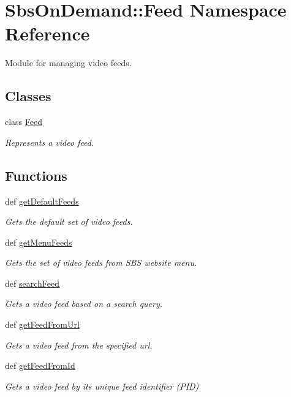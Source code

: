 \hypertarget{namespace_sbs_on_demand_1_1_feed}{
\section{\-Sbs\-On\-Demand\-:\-:\-Feed \-Namespace \-Reference}
\label{namespace_sbs_on_demand_1_1_feed}
}


\-Module for managing video feeds.  


\subsection*{\-Classes}
\begin{DoxyCompactItemize}
\item 
class \hyperlink{class_sbs_on_demand_1_1_feed_1_1_feed}{\-Feed}
\begin{DoxyCompactList}\small\item\em \-Represents a video feed. \end{DoxyCompactList}\end{DoxyCompactItemize}
\subsection*{\-Functions}
\begin{DoxyCompactItemize}
\item 
def \hyperlink{namespace_sbs_on_demand_1_1_feed_ae70ad1690068bcccc1c07fa009c0c183}{get\-Default\-Feeds}
\begin{DoxyCompactList}\small\item\em \-Gets the default set of video feeds. \end{DoxyCompactList}\item 
def \hyperlink{namespace_sbs_on_demand_1_1_feed_a5461b8578594d3d3419113c14e59146c}{get\-Menu\-Feeds}
\begin{DoxyCompactList}\small\item\em \-Gets the set of video feeds from \-S\-B\-S website menu. \end{DoxyCompactList}\item 
def \hyperlink{namespace_sbs_on_demand_1_1_feed_a764401ad3c64ff7d0d4254fca05ba54a}{search\-Feed}
\begin{DoxyCompactList}\small\item\em \-Gets a video feed based on a search query. \end{DoxyCompactList}\item 
def \hyperlink{namespace_sbs_on_demand_1_1_feed_a071c5bd67b98e9e29ffd684212a3d1fb}{get\-Feed\-From\-Url}
\begin{DoxyCompactList}\small\item\em \-Gets a video feed from the specified url. \end{DoxyCompactList}\item 
def \hyperlink{namespace_sbs_on_demand_1_1_feed_a2826493906b9dbe20999ca3bc23512dd}{get\-Feed\-From\-Id}
\begin{DoxyCompactList}\small\item\em \-Gets a video feed by its unique feed identifier (\-P\-I\-D) \end{DoxyCompactList}\end{DoxyCompactItemize}


